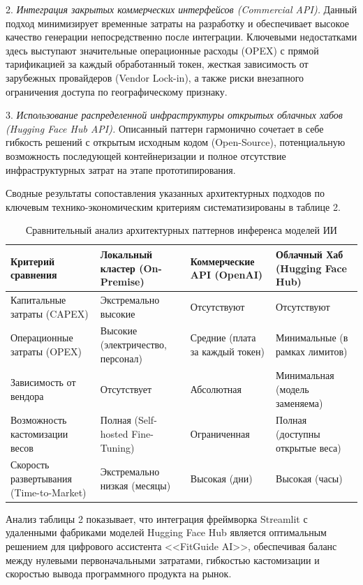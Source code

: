 \documentclass[14pt, a4paper]{extarticle}
\begin{document}
2. \textit{Интеграция закрытых коммерческих интерфейсов (Commercial API).} Данный подход минимизирует временные затраты на разработку и обеспечивает высокое качество генерации непосредственно после интеграции. Ключевыми недостатками здесь выступают значительные операционные расходы (OPEX) с прямой тарификацией за каждый обработанный токен, жесткая зависимость от зарубежных провайдеров (Vendor Lock-in), а также риски внезапного ограничения доступа по географическому признаку.

3. \textit{Использование распределенной инфраструктуры открытых облачных хабов (Hugging Face Hub API).} Описанный паттерн гармонично сочетает в себе гибкость решений с открытым исходным кодом (Open-Source), потенциальную возможность последующей контейнеризации и полное отсутствие инфраструктурных затрат на этапе прототипирования.

Сводные результаты сопоставления указанных архитектурных подходов по ключевым технико-экономическим критериям систематизированы в таблице 2.



\begin{table}[h!]
\centering
\caption{Сравнительный анализ архитектурных паттернов инференса моделей ИИ}
\bigskip
\begin{tabular}{|p{4cm}|p{3.5cm}|p{3.5cm}|p{3.5cm}|}
\hline
\textbf{Критерий сравнения} & \textbf{Локальный кластер (On-Premise)} & \textbf{Коммерческие API (OpenAI)} & \textbf{Облачный Хаб (Hugging Face Hub)} \\ \hline
Капитальные затраты (CAPEX) & Экстремально высокие & Отсутствуют & Отсутствуют \\ \hline
Операционные затраты (OPEX) & Высокие (электричество, персонал) & Средние (плата за каждый токен) & Минимальные (в рамках лимитов) \\ \hline
Зависимость от вендора & Отсутствует & Абсолютная & Минимальная (модель заменяема) \\ \hline
Возможность кастомизации весов & Полная (Self-hosted Fine-Tuning) & Ограниченная & Полная (доступны открытые веса) \\ \hline
Скорость развертывания (Time-to-Market) & Экстремально низкая (месяцы) & Высокая (дни) & Высокая (часы) \\ \hline
\end{tabular}
\end{table}

Анализ таблицы 2 показывает, что интеграция фреймворка Streamlit с удаленными фабриками моделей Hugging Face Hub является оптимальным решением для цифрового ассистента <<FitGuide AI>>, обеспечивая баланс между нулевыми первоначальными затратами, гибкостью кастомизации и скоростью вывода программного продукта на рынок.
\end{document}
